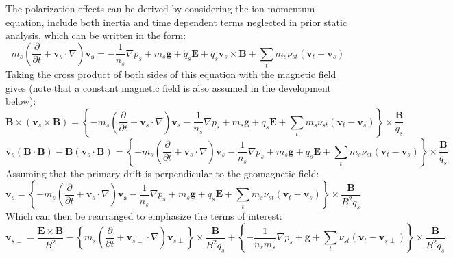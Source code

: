 \documentclass[11pt,letterpaper]{article}
\begin{document}
The polarization effects can be derived by considering the ion momentum equation, include both inertia and time dependent terms neglected in prior static analysis, which can be written in the form:  
\begin{equation}
m_s \left( \frac{\partial }{\partial t}  + \mathbf{v}_s \cdot \nabla \right) \mathbf{v_s} = - \frac{1}{n_s} \nabla p_s + m_s \mathbf{g} +  q_s \mathbf{E} + q_s \mathbf{v}_s \times \mathbf{B} + \sum_t m_s \nu_{st} \left(\mathbf{v}_t - \mathbf{v}_s \right)
\end{equation}
Taking the cross product of both sides of this equation with the magnetic field gives (note that a constant magnetic field is also assumed in the development below):  
\begin{equation}
\mathbf{B} \times \left( \mathbf{v}_s \times \mathbf{B} \right) = \left\{ - m_s \left( \frac{\partial }{\partial t}  + \mathbf{v}_s \cdot \nabla \right) \mathbf{v}_s - \frac{1}{n_s} \nabla p_s + m_s \mathbf{g} +  q_s \mathbf{E} + \sum_t m_s \nu_{st} \left(\mathbf{v}_t - \mathbf{v}_s \right) \right \} \times \frac{\mathbf{B}}{q_s}
\end{equation}
\begin{equation}
\mathbf{v}_s (\mathbf{B} \cdot \mathbf{B}) - \mathbf{B}( \mathbf{v}_s \cdot \mathbf{B} ) = \left\{ - m_s \left( \frac{\partial }{\partial t}  + \mathbf{v}_s \cdot \nabla \right) \mathbf{v}_s - \frac{1}{n_s} \nabla p_s + m_s \mathbf{g} +  q_s \mathbf{E} + \sum_t m_s \nu_{st} \left(\mathbf{v}_t - \mathbf{v}_s \right) \right \} \times \frac{\mathbf{B}}{q_s}
\end{equation}
Assuming that the primary drift is perpendicular to the geomagnetic field:  
\begin{equation}
\mathbf{v}_s = \left\{ - m_s \left( \frac{\partial }{\partial t}  + \mathbf{v}_s \cdot \nabla \right) \mathbf{v_s} - \frac{1}{n_s} \nabla p_s + m_s \mathbf{g} +  q_s \mathbf{E} + \sum_t m_s \nu_{st} \left(\mathbf{v}_t - \mathbf{v}_s \right) \right \} \times \frac{\mathbf{B}}{B^2 q_s}
\end{equation}
Which can then be rearranged to emphasize the terms of interest:  
\begin{equation}
\mathbf{v}_{s\perp} = \frac{\mathbf{E} \times \mathbf{B}}{B^2} - \left\{ m_s \left( \frac{\partial }{\partial t}  + \mathbf{v}_{s\perp} \cdot \nabla \right) \mathbf{v}_{s\perp} \right\} \times \frac{\mathbf{B}}{B^2 q_s} + \left\{ - \frac{1}{n_s m_s} \nabla p_s + \mathbf{g} + \sum_t \nu_{st} \left(\mathbf{v}_t - \mathbf{v}_{s\perp} \right) \right \} \times \frac{\mathbf{B}}{B^2 q_s}
\end{equation}
\end{document}

